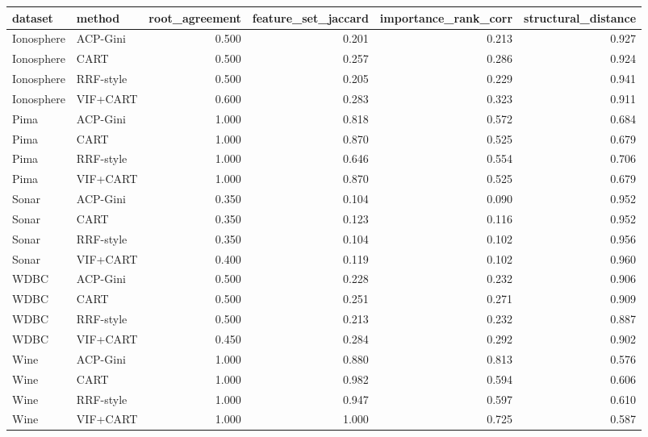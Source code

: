 \begin{tabular}{llrrrr}
\toprule
dataset & method & root\_agreement & feature\_set\_jaccard & importance\_rank\_corr & structural\_distance \\
\midrule
Ionosphere & ACP-Gini & 0.500 & 0.201 & 0.213 & 0.927 \\
Ionosphere & CART & 0.500 & 0.257 & 0.286 & 0.924 \\
Ionosphere & RRF-style & 0.500 & 0.205 & 0.229 & 0.941 \\
Ionosphere & VIF+CART & 0.600 & 0.283 & 0.323 & 0.911 \\
Pima & ACP-Gini & 1.000 & 0.818 & 0.572 & 0.684 \\
Pima & CART & 1.000 & 0.870 & 0.525 & 0.679 \\
Pima & RRF-style & 1.000 & 0.646 & 0.554 & 0.706 \\
Pima & VIF+CART & 1.000 & 0.870 & 0.525 & 0.679 \\
Sonar & ACP-Gini & 0.350 & 0.104 & 0.090 & 0.952 \\
Sonar & CART & 0.350 & 0.123 & 0.116 & 0.952 \\
Sonar & RRF-style & 0.350 & 0.104 & 0.102 & 0.956 \\
Sonar & VIF+CART & 0.400 & 0.119 & 0.102 & 0.960 \\
WDBC & ACP-Gini & 0.500 & 0.228 & 0.232 & 0.906 \\
WDBC & CART & 0.500 & 0.251 & 0.271 & 0.909 \\
WDBC & RRF-style & 0.500 & 0.213 & 0.232 & 0.887 \\
WDBC & VIF+CART & 0.450 & 0.284 & 0.292 & 0.902 \\
Wine & ACP-Gini & 1.000 & 0.880 & 0.813 & 0.576 \\
Wine & CART & 1.000 & 0.982 & 0.594 & 0.606 \\
Wine & RRF-style & 1.000 & 0.947 & 0.597 & 0.610 \\
Wine & VIF+CART & 1.000 & 1.000 & 0.725 & 0.587 \\
\bottomrule
\end{tabular}
